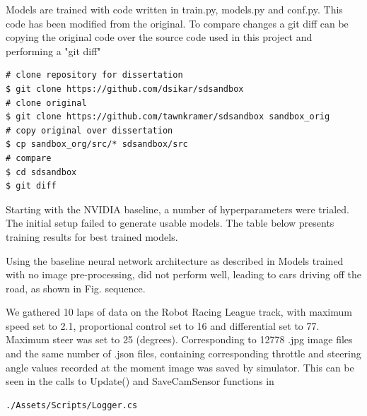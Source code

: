 Models are trained with code written in train.py, models.py and conf.py. This code has been modified from the original. To compare changes a git diff can be copying the original code over the source code used in this project and performing a "git diff"
\begin{verbatim}
# clone repository for dissertation
$ git clone https://github.com/dsikar/sdsandbox
# clone original
$ git clone https://github.com/tawnkramer/sdsandbox sandbox_orig
# copy original over dissertation
$ cp sandbox_org/src/* sdsandbox/src
# compare
$ cd sdsandbox 
$ git diff
\end{verbatim}


Starting with the NVIDIA baseline, a number of hyperparameters were trialed. The initial setup failed to generate usable models. 
The table below presents training results for best trained models.



Using the baseline neural network architecture as described in 
Models trained with no image pre-processing, did not perform well, leading to cars driving off the road, as shown in Fig.  sequence.

We gathered 10 laps of data on the Robot Racing League track, with maximum speed set to 2.1, proportional control set to 16 and differential set to 77. Maximum steer was set to 25 (degrees). Corresponding to 12778 .jpg image files and the same number of  .json files, containing corresponding throttle and steering angle values recorded at the moment image was saved by simulator. This can be seen in the calls to Update() and SaveCamSensor functions in  
\begin{verbatim}
./Assets/Scripts/Logger.cs
\end{verbatim}

